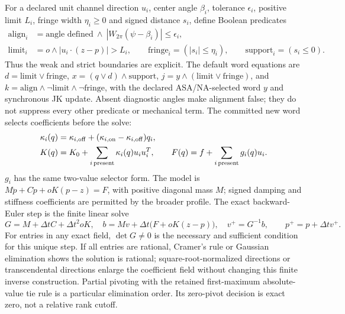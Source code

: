 For a declared unit channel direction $u_i$, center angle $\beta_i$, tolerance
$\epsilon_i$, positive limit $L_i$, fringe width $\eta_i\ge0$ and signed
distance $s_i$, define Boolean predicates
\begin{align}
 \mathrm{align}_i&=\text{angle defined}\ \land\
                  |W_{2\pi}(\psi-\beta_i)|\le\epsilon_i,\\
 \mathrm{limit}_i&=o\land |u_i\cdot(z-p)|>L_i,\qquad
 \mathrm{fringe}_i=(|s_i|\le\eta_i),\qquad
 \mathrm{support}_i=(s_i\le0).
\end{align}
Thus the weak and strict boundaries are explicit. The default word equations
are $d=\mathrm{limit}\lor\mathrm{fringe}$,
$x=(q\lor d)\land\mathrm{support}$,
$j=y\land(\mathrm{limit}\lor\mathrm{fringe})$, and
$k=\mathrm{align}\land\neg\mathrm{limit}\land\neg\mathrm{fringe}$, with the
declared ASA/NA-selected word $y$ and synchronous JK update. Absent diagnostic
angles make alignment false; they do not suppress every other predicate or
mechanical term. The committed new word selects coefficients before the solve:
\begin{align}
 \kappa_i(q)&=\kappa_{i,\rm off}
          +(\kappa_{i,\rm on}-\kappa_{i,\rm off})q_i,\\
 K(q)&=K_0+\sum_{i\,\mathrm{present}}\kappa_i(q)u_iu_i^T,
 \qquad F(q)=f+\sum_{i\,\mathrm{present}}g_i(q)u_i .
\end{align}
$g_i$ has the same two-value selector form. The model is
$M\ddot p+C\dot p+oK(p-z)=F$, with positive diagonal mass $M$; signed damping
and stiffness coefficients are permitted by the broader profile. The exact
backward-Euler step is the finite linear solve
\begin{equation}
 G=M+\Delta t C+\Delta t^2oK,\quad
 b=Mv+\Delta t\bigl(F+oK(z-p)\bigr),\quad
 v^+=G^{-1}b,\qquad p^+=p+\Delta t v^+ .
\end{equation}
For entries in any exact field, $\det G\ne0$ is the necessary and sufficient
condition for this unique step. If all entries are rational, Cramer's rule or
Gaussian elimination shows the solution is rational; square-root-normalized
directions or transcendental directions enlarge the coefficient field without
changing this finite inverse construction. Partial pivoting with the retained
first-maximum absolute-value tie rule is a particular elimination order. Its
zero-pivot decision is exact zero, not a relative rank cutoff.

